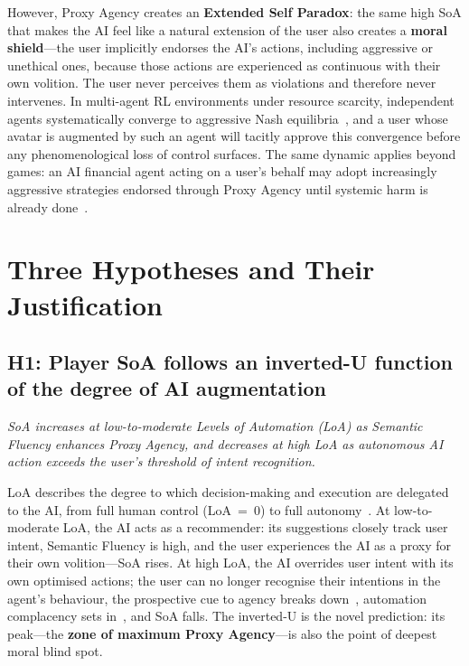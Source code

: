\documentclass[runningheads]{llncs}
\begin{document}
However, Proxy Agency creates an \textbf{Extended Self Paradox}: the same high
SoA that makes the AI feel like a natural extension of the user also creates a
\textbf{moral shield}---the user implicitly endorses the AI's actions, including
aggressive or unethical ones, because those actions are experienced as continuous
with their own volition. The user never perceives them as violations and
therefore never intervenes. In multi-agent RL environments under resource
scarcity, independent agents systematically converge to aggressive Nash
equilibria~\cite{leibo17}, and a user whose avatar is augmented by such an
agent will tacitly approve this convergence before any phenomenological loss of
control surfaces. The same dynamic applies beyond games: an AI financial agent
acting on a user's behalf may adopt increasingly aggressive strategies endorsed
through Proxy Agency until systemic harm is already done~\cite{rajan11}.

\section{Three Hypotheses and Their Justification}

\subsection*{H1: Player SoA follows an inverted-U function of the degree of
AI augmentation}

\textit{SoA increases at low-to-moderate Levels of Automation (LoA) as
Semantic Fluency enhances Proxy Agency, and decreases at high LoA as
autonomous AI action exceeds the user's threshold of intent recognition.}

LoA describes the degree to which decision-making and execution are delegated
to the AI, from full human control (LoA~=~0) to full
autonomy~\cite{ueda21}. At low-to-moderate LoA, the AI acts as a recommender:
its suggestions closely track user intent, Semantic Fluency is high, and the
user experiences the AI as a proxy for their own volition---SoA rises. At high
LoA, the AI overrides user intent with its own optimised actions; the user can
no longer recognise their intentions in the agent's behaviour, the prospective
cue to agency breaks down~\cite{chambon12}, automation complacency sets
in~\cite{ueda21}, and SoA falls. The inverted-U is the novel prediction: its
peak---the \textbf{zone of maximum Proxy Agency}---is also the point of deepest
moral blind spot.
\end{document}

